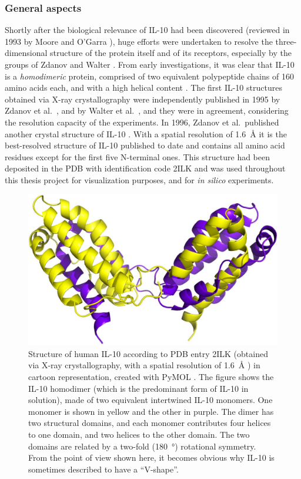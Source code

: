 \subsubsection{General aspects}
Shortly after the biological relevance of IL-10 had been discovered (reviewed in
1993 by Moore and O'Garra \cite{il10_first_review_1993}), huge efforts were
undertaken to resolve the three-dimensional structure of the protein itself and
of its receptors, especially by the groups of Zdanov and Walter
\cite{zdanov_review_2010, zdanov_review_2004, bookchapter_walter_il10_2004}.
From early investigations, it was clear that IL-10 is a \textit{homodimeric}
protein, comprised of two equivalent polypeptide chains of 160 amino acids each,
and with a high helical content \cite{vieira_moore_il10homodimer_1991}. The
first IL-10 structures obtained via X-ray crystallography were independently
published in 1995 by Zdanov et al.\ \cite{Zdanov1995}, and by Walter et al.\
\cite{il10_crystal_walter_1995}, and they were in agreement, considering the
resolution capacity of the experiments. In 1996, Zdanov et al.\ published
another crystal structure of IL-10 \cite{Zdanov1996}. With a spatial resolution
of \SI{1.6}{\angstrom} it is the best-resolved structure of IL-10 published to
date and contains all amino acid residues except for the first five N-terminal
ones. This structure had been deposited in the PDB with identification code 2ILK
and was used throughout this thesis project for visualization purposes, and for
\textit{in silico} experiments.

\begin{figure}
\centering
\includegraphics[width=1.0\textwidth]{gfx/background/IL10_2ilk_dimer_yellow_blue.jpg}
\caption[]{
Structure of human IL-10 according to PDB entry 2ILK (obtained via X-ray
crystallography, with a spatial resolution of \SI{1.6}{\angstrom}
\cite{Zdanov1996}) in cartoon representation, created with PyMOL \cite{pymol}.
The figure shows the IL-10 homodimer (which is the predominant form of IL-10 in
solution), made of two equivalent intertwined IL-10 monomers. One monomer is
shown in yellow and the other in purple. The dimer has two structural domains,
and each monomer contributes four helices to one domain, and two helices to the
other domain. The two domains are related by a two-fold (\SI{180}{\degree})
rotational symmetry. From the point of view shown here, it becomes obvious why
IL-10 is sometimes described to have a \enquote{V-shape}. }
\label{fig:bg:il10_dimer_vshape}
\end{figure}

